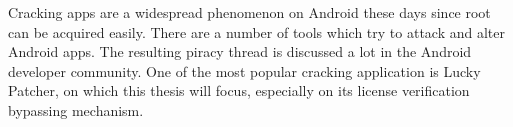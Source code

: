 Cracking apps are a widespread phenomenon on Android these days since root can be acquired easily.
There are a number of tools which try to attack and alter Android apps.
The resulting piracy thread is discussed a lot in the Android developer community.
One of the most popular cracking application is Lucky Patcher, on which this thesis will focus, especially on its license verification bypassing mechanism.
